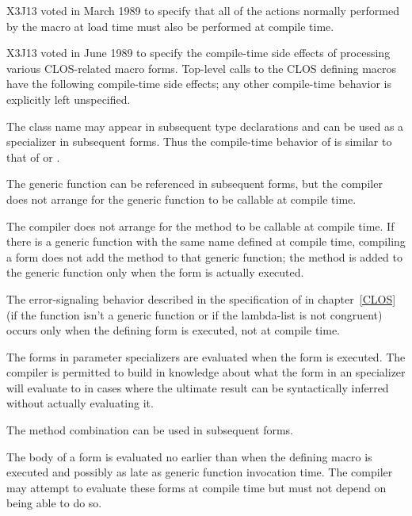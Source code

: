 \begin{newer}
\begin{flushdesc}
\item[\cdf{in-package}]

X3J13 voted in March 1989  to specify that
all of the actions normally performed by the  macro at load
time must also be performed at compile time.
\end{flushdesc}

X3J13 voted in June 1989 
to specify the compile-time side effects of processing various CLOS-related
macro forms.  Top-level calls to the CLOS defining macros have the
 following compile-time side effects; any other compile-time behavior
 is explicitly left unspecified.

\begin{flushdesc}
\item[\cdf{defclass}]
The class name may appear in subsequent type declarations and
can be used as a specializer in subsequent  forms.
Thus the compile-time behavior of  is similar to that of
 or .

\item[\cdf{defgeneric}]
The generic function can be referenced in subsequent  forms,
but the compiler does not arrange for the generic function to be callable
    at compile time.

\item[\cdf{defmethod}]  
The compiler does not arrange for the method to be callable at compile
    time.  If there is a generic function with the same name defined at
    compile time, compiling a  form does not add the method to that 
    generic function; the method is added to the generic
    function only when the  form is actually executed.

    The error-signaling behavior described in the specification of
     in chapter~\ref{CLOS} (if the function isn't a generic function
    or if the lambda-list is not congruent) occurs only when the defining
    form is executed, not at compile time.

    The forms in  parameter specializers are evaluated when the 
    form is executed.  The compiler is permitted to build in knowledge
    about what the form in an  specializer will evaluate to in cases
    where the ultimate result can be syntactically inferred without
    actually evaluating it.

\item[\cdf{define-method-combination}]
The method combination can be used in subsequent  forms.  

    The body of a  form is evaluated no earlier 
    than when the defining macro is executed and possibly as late as 
    generic function invocation time.  The compiler may attempt to
    evaluate these forms at compile time but must not depend on being able
    to do so.
\end{flushdesc}
\end{newer}



